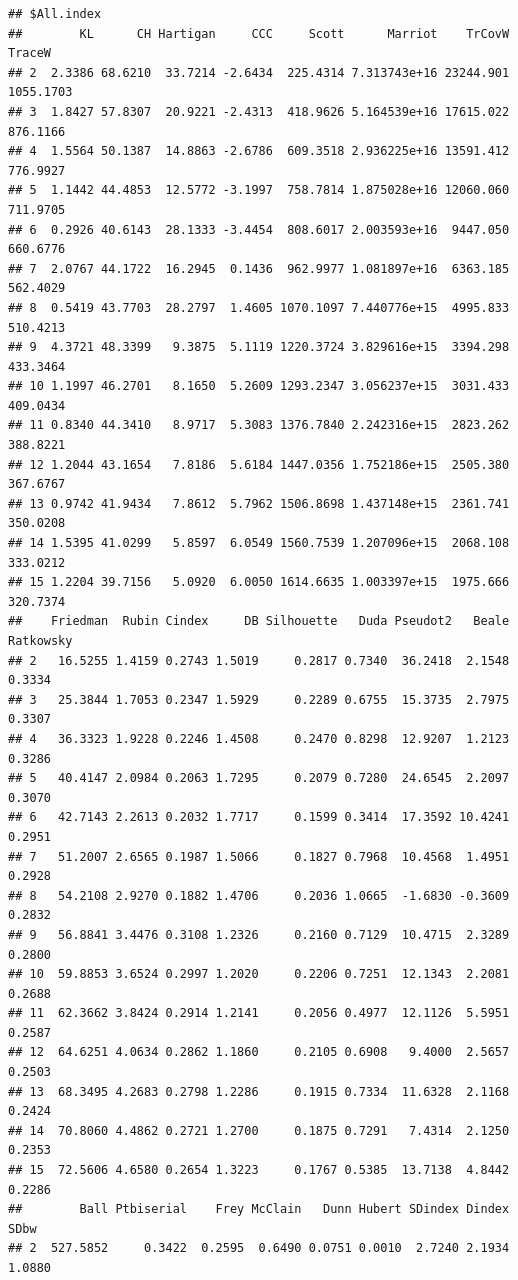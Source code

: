 \documentclass[
]{article}
\begin{document}
\begin{verbatim}
## $All.index
##        KL      CH Hartigan     CCC     Scott      Marriot    TrCovW    TraceW
## 2  2.3386 68.6210  33.7214 -2.6434  225.4314 7.313743e+16 23244.901 1055.1703
## 3  1.8427 57.8307  20.9221 -2.4313  418.9626 5.164539e+16 17615.022  876.1166
## 4  1.5564 50.1387  14.8863 -2.6786  609.3518 2.936225e+16 13591.412  776.9927
## 5  1.1442 44.4853  12.5772 -3.1997  758.7814 1.875028e+16 12060.060  711.9705
## 6  0.2926 40.6143  28.1333 -3.4454  808.6017 2.003593e+16  9447.050  660.6776
## 7  2.0767 44.1722  16.2945  0.1436  962.9977 1.081897e+16  6363.185  562.4029
## 8  0.5419 43.7703  28.2797  1.4605 1070.1097 7.440776e+15  4995.833  510.4213
## 9  4.3721 48.3399   9.3875  5.1119 1220.3724 3.829616e+15  3394.298  433.3464
## 10 1.1997 46.2701   8.1650  5.2609 1293.2347 3.056237e+15  3031.433  409.0434
## 11 0.8340 44.3410   8.9717  5.3083 1376.7840 2.242316e+15  2823.262  388.8221
## 12 1.2044 43.1654   7.8186  5.6184 1447.0356 1.752186e+15  2505.380  367.6767
## 13 0.9742 41.9434   7.8612  5.7962 1506.8698 1.437148e+15  2361.741  350.0208
## 14 1.5395 41.0299   5.8597  6.0549 1560.7539 1.207096e+15  2068.108  333.0212
## 15 1.2204 39.7156   5.0920  6.0050 1614.6635 1.003397e+15  1975.666  320.7374
##    Friedman  Rubin Cindex     DB Silhouette   Duda Pseudot2   Beale Ratkowsky
## 2   16.5255 1.4159 0.2743 1.5019     0.2817 0.7340  36.2418  2.1548    0.3334
## 3   25.3844 1.7053 0.2347 1.5929     0.2289 0.6755  15.3735  2.7975    0.3307
## 4   36.3323 1.9228 0.2246 1.4508     0.2470 0.8298  12.9207  1.2123    0.3286
## 5   40.4147 2.0984 0.2063 1.7295     0.2079 0.7280  24.6545  2.2097    0.3070
## 6   42.7143 2.2613 0.2032 1.7717     0.1599 0.3414  17.3592 10.4241    0.2951
## 7   51.2007 2.6565 0.1987 1.5066     0.1827 0.7968  10.4568  1.4951    0.2928
## 8   54.2108 2.9270 0.1882 1.4706     0.2036 1.0665  -1.6830 -0.3609    0.2832
## 9   56.8841 3.4476 0.3108 1.2326     0.2160 0.7129  10.4715  2.3289    0.2800
## 10  59.8853 3.6524 0.2997 1.2020     0.2206 0.7251  12.1343  2.2081    0.2688
## 11  62.3662 3.8424 0.2914 1.2141     0.2056 0.4977  12.1126  5.5951    0.2587
## 12  64.6251 4.0634 0.2862 1.1860     0.2105 0.6908   9.4000  2.5657    0.2503
## 13  68.3495 4.2683 0.2798 1.2286     0.1915 0.7334  11.6328  2.1168    0.2424
## 14  70.8060 4.4862 0.2721 1.2700     0.1875 0.7291   7.4314  2.1250    0.2353
## 15  72.5606 4.6580 0.2654 1.3223     0.1767 0.5385  13.7138  4.8442    0.2286
##        Ball Ptbiserial    Frey McClain   Dunn Hubert SDindex Dindex   SDbw
## 2  527.5852     0.3422  0.2595  0.6490 0.0751 0.0010  2.7240 2.1934 1.0880

\end{verbatim}
\end{document}

